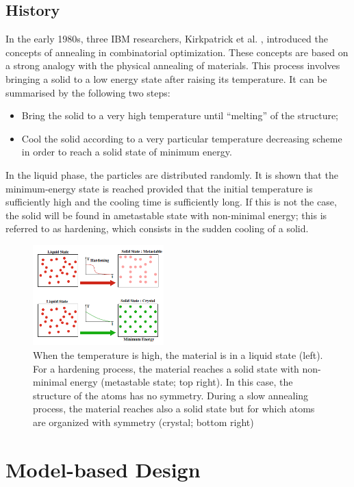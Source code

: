 \documentclass[conference]{IEEEtran}
\begin{document}
\subsection{History}
In the early 1980s, three IBM researchers, Kirkpatrick et al. \cite{b2}, introduced the concepts of annealing in combinatorial optimization. These concepts are based on a strong analogy with the physical annealing of materials. This process involves bringing a solid to a low energy state after raising its temperature. It can be summarised by the following two steps:
\begin{itemize}
    \item Bring the solid to a very high temperature until “melting” of the structure;
    \item Cool the solid according to a very particular temperature decreasing scheme in order to reach a solid state of minimum energy.
\end{itemize}

In the liquid phase, the particles are distributed randomly. It is shown that the minimum-energy state is reached provided that the initial temperature is sufficiently high and the cooling time is sufficiently long. If this is not the case, the solid will be
found in ametastable state with non-minimal energy; this is referred to as hardening, which consists in the sudden cooling of a solid.

\begin{figure}[H]
\centerline{\includegraphics[width=0.45\textwidth,height=0.45\textheight,keepaspectratio]{fig1.png}}
\caption{When the temperature is high, the material is in a liquid state (left). For a hardening process, the material reaches a solid state with non-minimal energy (metastable state; top right). In
this case, the structure of the atoms has no symmetry. During a slow annealing process, the material reaches also a solid state but for which atoms are organized with symmetry (crystal; bottom right)}
\end{figure}


\section{Model-based Design}
\end{document}
